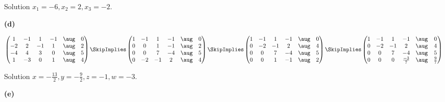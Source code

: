 \documentclass[oneside,12pt]{amsart}
\begin{document}
\bigskip

Solution $x_1=-6, x_2=2, x_3=-2$.


\textbf{(d)}

\bigskip

$
\begin{pmatrix}
1 & -1 & 1 & -1 & \aug &  0 \\
-2 & 2 & -1 & 1 & \aug &  2 \\
-4 & 4 & 3 & 0 &  \aug &  5 \\
1 & -3 & 0 & 1 &  \aug &  4
\end{pmatrix}
\SkipImplies
\begin{pmatrix}
1 & -1 & 1 & -1 &  \aug & 0 \\
0 & 0 & 1 & -1 &   \aug & 2 \\
0 & 0 & 7 & -4 &   \aug & 5 \\
0 & -2 & -1 & 2 &  \aug & 4
\end{pmatrix}
\SkipImplies
\begin{pmatrix}
1 & -1 & 1 & -1 &  \aug & 0 \\
0 & -2 & -1 & 2 &  \aug & 4 \\
0 & 0 & 7 & -4 &   \aug & 5 \\
0 & 0 & 1 & -1 &   \aug & 2 \\
\end{pmatrix}
\SkipImplies
\begin{pmatrix}
1 & -1 & 1 & -1 &           \aug & 0 \\
0 & -2 & -1 & 2 &           \aug & 4 \\
0 & 0 & 7 & -4 &            \aug & 5 \\
0 & 0 & 0 & \frac{-3}{7} &  \aug & \frac{9}{7}
\end{pmatrix}
$

\bigskip

Solution $x=-\frac{13}{2}, y=-\frac{9}{2}, z = -1, w = -3$.


\textbf{(e)}

\bigskip
\end{document}
